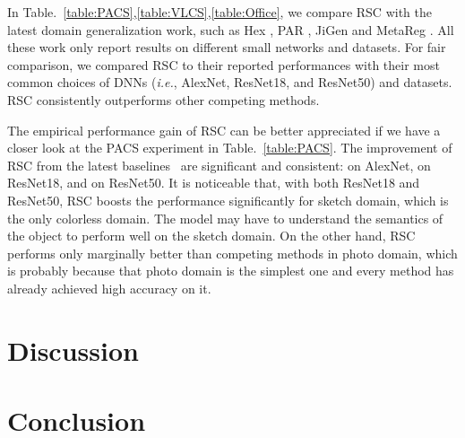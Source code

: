 \documentclass[runningheads]{llncs}
\newcommand{\beginsupplement}{\setcounter{table}{0}
        \renewcommand{\thetable}{A\arabic{table}}\setcounter{figure}{0}
        \renewcommand{\thefigure}{A\arabic{figure}}\setcounter{section}{0}
        \renewcommand{\thesection}{A\arabic{section}}}
\newcommand{\method}{RSC}
\begin{document}
In Table.~\ref{table:PACS},\ref{table:VLCS},\ref{table:Office}, we compare RSC with the latest domain generalization work, such as Hex \cite{wang2018learning}, PAR \cite{wang2019learning}, JiGen \cite{carlucci2019domain} and MetaReg \cite{balaji2018metareg}. All these work only report results on different small networks and datasets. 
For fair comparison, we compared RSC to their reported performances with their most common choices of DNNs (\textit{i.e.}, AlexNet, ResNet18, and ResNet50) and datasets. 
\method{} consistently outperforms other competing methods. 




The empirical performance gain of \method{} can be better appreciated if we have a closer look at the PACS experiment in Table.~\ref{table:PACS}. 
The improvement of RSC from the latest baselines~\cite{carlucci2019domain} are significant and consistent:  on AlexNet,  on ResNet18, and  on ResNet50.
It is noticeable that, with both ResNet18 and ResNet50, 
\method{} boosts the performance significantly for sketch domain, 
which is the only colorless domain. 
The model may have to understand the semantics of the object to 
perform well on the sketch domain. 
On the other hand, \method{} performs only marginally better than competing methods
in photo domain, 
which is probably because that photo domain is the simplest one
and every method has already achieved high accuracy on it. 















 
\section{Discussion}
\label{sec:diss}


\section{Conclusion}
\label{sec:con}



\clearpage








\newpage
\beginsupplement


\end{document}
